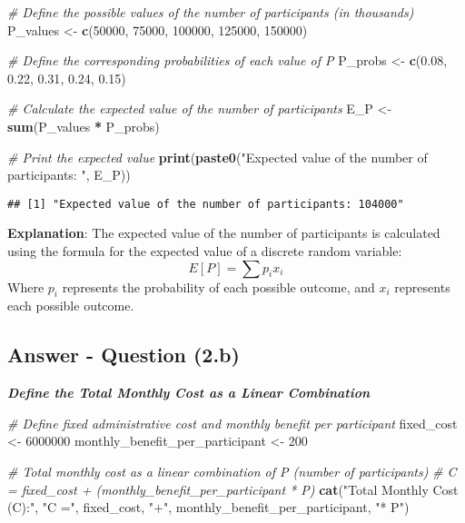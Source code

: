 \documentclass[
  11pt,
]{article}
\newenvironment{Shaded}{\begin{snugshade}}{\end{snugshade}}
\newcommand{\CommentTok}[1]{\textcolor[rgb]{0.56,0.35,0.01}{\textit{#1}}}
\newcommand{\DecValTok}[1]{\textcolor[rgb]{0.00,0.00,0.81}{#1}}
\newcommand{\FloatTok}[1]{\textcolor[rgb]{0.00,0.00,0.81}{#1}}
\newcommand{\FunctionTok}[1]{\textcolor[rgb]{0.13,0.29,0.53}{\textbf{#1}}}
\newcommand{\NormalTok}[1]{#1}
\newcommand{\OtherTok}[1]{\textcolor[rgb]{0.56,0.35,0.01}{#1}}
\newcommand{\SpecialCharTok}[1]{\textcolor[rgb]{0.81,0.36,0.00}{\textbf{#1}}}
\newcommand{\StringTok}[1]{\textcolor[rgb]{0.31,0.60,0.02}{#1}}
\begin{document}
\begin{Shaded}
\begin{Highlighting}[]
\CommentTok{\# Define the possible values of the number of participants (in thousands)}
\NormalTok{P\_values }\OtherTok{\textless{}{-}} \FunctionTok{c}\NormalTok{(}\DecValTok{50000}\NormalTok{, }\DecValTok{75000}\NormalTok{, }\DecValTok{100000}\NormalTok{, }\DecValTok{125000}\NormalTok{, }\DecValTok{150000}\NormalTok{)}

\CommentTok{\# Define the corresponding probabilities of each value of P}
\NormalTok{P\_probs }\OtherTok{\textless{}{-}} \FunctionTok{c}\NormalTok{(}\FloatTok{0.08}\NormalTok{, }\FloatTok{0.22}\NormalTok{, }\FloatTok{0.31}\NormalTok{, }\FloatTok{0.24}\NormalTok{, }\FloatTok{0.15}\NormalTok{)}

\CommentTok{\# Calculate the expected value of the number of participants}
\NormalTok{E\_P }\OtherTok{\textless{}{-}} \FunctionTok{sum}\NormalTok{(P\_values }\SpecialCharTok{*}\NormalTok{ P\_probs)}

\CommentTok{\# Print the expected value}
\FunctionTok{print}\NormalTok{(}\FunctionTok{paste0}\NormalTok{(}\StringTok{"Expected value of the number of participants: "}\NormalTok{, E\_P))}
\end{Highlighting}
\end{Shaded}

\begin{verbatim}
## [1] "Expected value of the number of participants: 104000"
\end{verbatim}

\textbf{Explanation}: The expected value of the number of participants
is calculated using the formula for the expected value of a discrete
random variable: \[E[P] = \sum p_i x_i\] Where \(p_i\) represents the
probability of each possible outcome, and \(x_i\) represents each
possible outcome.

\subsection{Answer - Question (2.b)}\label{answer---question-2.b}

\textbf{\emph{Define the Total Monthly Cost as a Linear Combination}}

\begin{Shaded}
\begin{Highlighting}[]
\CommentTok{\# Define fixed administrative cost and monthly benefit per participant}
\NormalTok{fixed\_cost }\OtherTok{\textless{}{-}} \DecValTok{6000000}
\NormalTok{monthly\_benefit\_per\_participant }\OtherTok{\textless{}{-}} \DecValTok{200}

\CommentTok{\# Total monthly cost as a linear combination of P (number of participants)}
\CommentTok{\# C = fixed\_cost + (monthly\_benefit\_per\_participant * P)}
\FunctionTok{cat}\NormalTok{(}\StringTok{"Total Monthly Cost (C):"}\NormalTok{, }\StringTok{"C ="}\NormalTok{, fixed\_cost, }\StringTok{"+"}\NormalTok{, monthly\_benefit\_per\_participant, }\StringTok{"* P"}\NormalTok{)}
\end{Highlighting}
\end{Shaded}
\end{document}
